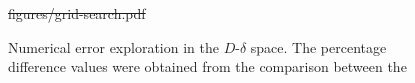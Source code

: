 \documentclass[extra, referee]{gji}
\providecommand{\DIFdeltex}[1]{{\protect\color{red}\sout{#1}}}                      %
\providecommand{\DIFdelFL}[1]{\DIFdel{#1}} %
\providecommand{\DIFaddbeginFL}{} %
\providecommand{\DIFaddendFL}{} %
\providecommand{\DIFdelbeginFL}{} %
\providecommand{\DIFdelendFL}{} %
\providecommand{\DIFdel}[1]{\texorpdfstring{\DIFdeltex{#1}}{}} %
\newcommand{\DIFscaledelfig}{0.5}
\newlength{\DIFdelgraphicswidth} %
\newlength{\DIFdelgraphicsheight} %
\newcommand{\DIFaddincludegraphics}[2][]{{\color{blue}\fbox{\DIFOincludegraphics[#1]{#2}}}} %
\newcommand{\DIFdelincludegraphics}[2][]{%
\sbox{\DIFdelgraphicsbox}{\DIFOincludegraphics[#1]{#2}}%
\settoboxwidth{\DIFdelgraphicswidth}{\DIFdelgraphicsbox} %
\settoboxtotalheight{\DIFdelgraphicsheight}{\DIFdelgraphicsbox} %
\scalebox{\DIFscaledelfig}{%
\parbox[b]{\DIFdelgraphicswidth}{\usebox{\DIFdelgraphicsbox}\\[-\baselineskip] \rule{\DIFdelgraphicswidth}{0em}}\llap{\resizebox{\DIFdelgraphicswidth}{\DIFdelgraphicsheight}{%
\setlength{\unitlength}{\DIFdelgraphicswidth}%
\begin{picture}(1,1)%
\thicklines\linethickness{2pt} %
{\color[rgb]{1,0,0}\put(0,0){\framebox(1,1){}}}%
{\color[rgb]{1,0,0}\put(0,0){\line( 1,1){1}}}%
{\color[rgb]{1,0,0}\put(0,1){\line(1,-1){1}}}%
\end{picture}%
}\hspace*{3pt}}} %
} %
\DeclareRobustCommand{\DIFaddbeginFL}{\DIFOaddbeginFL \let\includegraphics\DIFaddincludegraphics} %
\DeclareRobustCommand{\DIFaddendFL}{\DIFOaddendFL \let\includegraphics\DIFOincludegraphics} %
\DeclareRobustCommand{\DIFdelbeginFL}{\DIFOdelbeginFL \let\includegraphics\DIFdelincludegraphics} %
\DeclareRobustCommand{\DIFdelendFL}{\DIFOaddendFL \let\includegraphics\DIFOincludegraphics} %
\begin{document}
\begin{figure}
\centering
\DIFdelbeginFL %
\DIFdelFL{figures/grid-search.pdf}%
\DIFdelendFL \DIFaddbeginFL {}
\DIFaddendFL \caption{
    Numerical error exploration in the $D$-$\delta$ space.
    The percentage difference values were obtained from the comparison between the
}
\end{figure}
\end{document}
